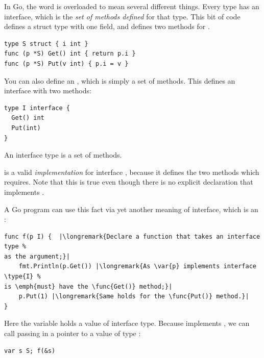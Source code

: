 \noindent{}
In Go, the word  is overloaded to mean several different
things. Every type has an interface, which is the \emph{set of methods
defined} for 
that type. This bit of code defines a struct type  with one field, and
defines two methods for .
\begin{lstlisting}[caption=Defining a struct and methods on it,label=src:interface object]
type S struct { i int }
func (p *S) Get() int { return p.i }
func (p *S) Put(v int) { p.i = v }
\end{lstlisting}
You can also define an , which is simply a set of methods.
This defines an interface  with two methods:
\begin{lstlisting}
type I interface {
  Get() int
  Put(int)
}
\end{lstlisting}
\begin{lbar}
An interface type is a set of methods.
\end{lbar}

\noindent{} is a valid \emph{implementation} for interface , because it defines the two 
methods which  requires. Note that this is true even though there is 
no explicit declaration that  implements . 

A Go program can use 
this fact via yet another meaning of interface, which is an
:

\begin{lstlisting}
func f(p I) {  |\longremark{Declare a function that takes an interface type %
as the argument;}|
    fmt.Println(p.Get()) |\longremark{As \var{p} implements interface \type{I} %
is \emph{must} have the \func{Get()} method;}|
    p.Put(1) |\longremark{Same holds for the \func{Put()} method.}|
}
\end{lstlisting}
\showremarks
Here the variable  holds a value of interface type. Because
 implements , we can call  passing in a pointer to a 
value of type :
\begin{lstlisting}
var s S; f(&s)
\end{lstlisting}

